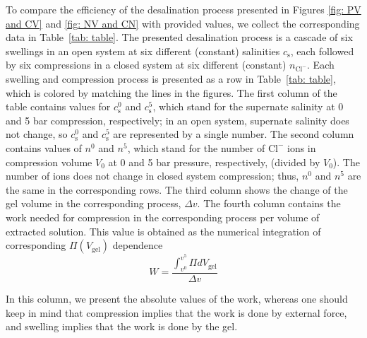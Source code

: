\documentclass[gels,article,accept,pdftex,moreauthors]{Definitions/mdpi}
\newcommand{\ncl}{n_\mathrm{Cl^-}}
\newcommand{\cl}{\mathrm{Cl^-}}
\newcommand{\cs}{c_{\mathrm{s}}}
\newcommand{\Vgel}{V_\mathrm{gel}}
\newcommand{\Pgel}{\Pi}
\newcommand{\Vbox}{V_0}
\begin{document}
To compare the efficiency of the desalination process presented in Figures \ref{fig: PV and CV} and \ref{fig: NV and CN} with provided values, we collect the corresponding data in Table~\ref{tab: table}.
The presented desalination process is a cascade of six swellings in an open system at six different (constant) salinities $\cs$, each followed by six compressions in a closed system at six different (constant) $\ncl$.
Each swelling and compression process is presented as a row in Table~\ref{tab: table}, which is colored by matching the lines in the figures.
The first column of the table contains values for $\cs^0$ and $\cs^5$, which stand for the supernate salinity at 0 and 5 bar compression, respectively; in an open system, supernate salinity does not change, so $\cs^0$ and $\cs^5$ are represented by a single number.
The second column contains values of $n^0$ and $n^5$, which stand for the number of $\cl$ ions in compression volume $\Vbox$ at 0 and 5 bar pressure, respectively, (divided by $\Vbox$).
The number of ions does not change in closed system compression; thus, $n^0$ and $n^5$ are the same in the corresponding rows.
The third column shows the change of the gel volume in the corresponding process, $\Delta v$.
The fourth column contains the work needed for compression in the corresponding process per volume of extracted solution.
This value is obtained as the numerical integration of corresponding $\Pgel(\Vgel)$ dependence \citep{Atkins}
\begin{equation}
W = \frac{\int_{v^0}^{v^5} \Pgel d\Vgel}{\Delta v}
\end{equation}

In this column, we present the absolute values of the work,
whereas one should keep in mind that compression implies that the work is done by external force, and swelling implies that the work is done by the gel.
\end{document}
